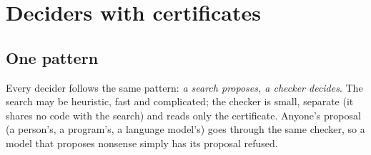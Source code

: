 \chapter{Deciders with certificates}\label{ch:deciders}

\section{One pattern}

Every decider follows the same pattern: \emph{a search proposes, a checker decides}. The search may be
heuristic, fast and complicated; the checker is small, separate (it shares no code with the search) and
reads only the certificate. Anyone's proposal (a person's, a program's, a language model's) goes
through the same checker, so a model that proposes nonsense simply has its proposal refused.


